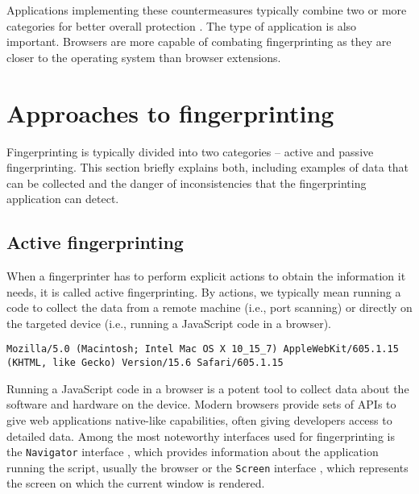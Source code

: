 Applications implementing these countermeasures typically combine two or more categories for better overall protection \cite{JShelterPaper}. The type of application is also important. Browsers are more capable of combating fingerprinting as they are closer to the operating system than browser extensions.

\section{Approaches to fingerprinting}
\label{Section:FingerprintingApproaches}

Fingerprinting is typically divided into two categories -- active and passive fingerprinting. This section briefly explains both, including examples of data that can be collected and the danger of inconsistencies that the fingerprinting application can detect.

\subsection{Active fingerprinting}

When a fingerprinter has to perform explicit actions to obtain the information it needs, it is called active fingerprinting. By actions, we typically mean running a code to collect the data from a remote machine (i.e., port scanning) or directly on the targeted device (i.e., running a JavaScript code in a browser).

\bigbreak

\begin{lstlisting}[caption={An example of Safari User-Agent string.}, label={Listing:UserAgentSafariFingerprinting}]
Mozilla/5.0 (Macintosh; Intel Mac OS X 10_15_7) AppleWebKit/605.1.15 (KHTML, like Gecko) Version/15.6 Safari/605.1.15
\end{lstlisting}

\medbreak

Running a JavaScript code in a browser is a potent tool to collect data about the software and hardware on the device. Modern browsers provide sets of APIs to give web applications native-like capabilities, often giving developers access to detailed data. Among the most noteworthy interfaces used for fingerprinting is the \texttt{Navigator} interface \cite{MDNNavigatorInterface}, which provides information about the application running the script, usually the browser or the \texttt{Screen} interface \cite{MDNScreenInterface}, which represents the screen on which the current window is rendered.

